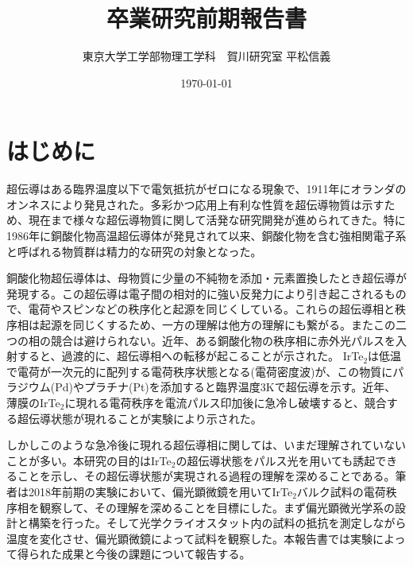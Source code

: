\documentclass[11pt,a4paper]{jsarticle}
\title{卒業研究前期報告書}
\author{東京大学工学部物理工学科　賀川研究室 平松信義}
\date{\today}
\begin{document}
\maketitle

\tableofcontents
\newpage

\section{はじめに}
超伝導はある臨界温度以下で電気抵抗がゼロになる現象で、1911年にオランダのオンネスにより発見された。多彩かつ応用上有利な性質を超伝導物質は示すため、現在まで様々な超伝導物質に関して活発な研究開発が進められてきた。特に1986年に銅酸化物高温超伝導体が発見されて以来、銅酸化物を含む強相関電子系と呼ばれる物質群は精力的な研究の対象となった。

銅酸化物超伝導体は、母物質に少量の不純物を添加・元素置換したとき超伝導が発現する。この超伝導は電子間の相対的に強い反発力により引き起こされるもので、電荷やスピンなどの秩序化と起源を同じくしている。これらの超伝導相と秩序相は起源を同じくするため、一方の理解は他方の理解にも繋がる。またこの二つの相の競合は避けられない。近年、ある銅酸化物の秩序相に赤外光パルスを入射すると、過渡的に、超伝導相への転移が起こることが示された\cite{Fausti}。
IrTe$_2$は低温で電荷が一次元的に配列する電荷秩序状態となる(電荷密度波)が、この物質にパラジウム(Pd)やプラチナ(Pt)を添加すると臨界温度3Kで超伝導を示す。\cite{}近年、薄膜のIrTe$_2$に現れる電荷秩序を電流パルス印加後に急冷し破壊すると、競合する超伝導状態が現れることが実験により示された\cite{SC_IrTe2}。

しかしこのような急冷後に現れる超伝導相に関しては、いまだ理解されていないことが多い。本研究の目的はIrTe$_2$の超伝導状態をパルス光を用いても誘起できることを示し、その超伝導状態が実現される過程の理解を深めることである。筆者は2018年前期の実験において、偏光顕微鏡を用いてIrTe$_2$バルク試料の電荷秩序相を観察して、その理解を深めることを目標にした。まず偏光顕微光学系の設計と構築を行った。そして光学クライオスタット内の試料の抵抗を測定しながら温度を変化させ、偏光顕微鏡によって試料を観察した。本報告書では実験によって得られた成果と今後の課題について報告する。
\end{document}
